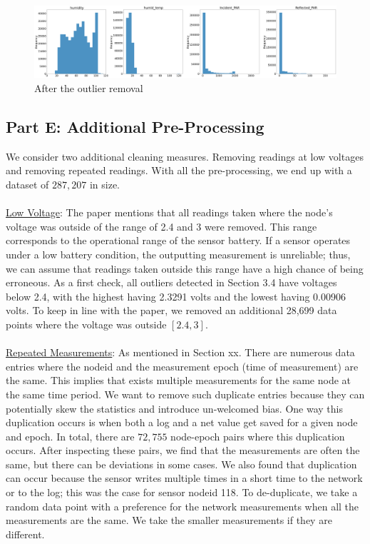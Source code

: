 \documentclass[11pt, letterpaper]{article}
\begin{document}
\begin{figure}[h!]
\centering
\includegraphics[width=1.0\textwidth]{Fig4_combined_hist_after.png}
\caption{After the outlier removal}
\label{fig3:combined_hist_after_clean}
\end{figure}


\subsection{Part E: Additional Pre-Processing}
We consider two additional cleaning measures. Removing readings at low voltages and removing repeated readings. With all the pre-processing, we end up with a dataset of $287,207$ in size.
\\ \\
\underline{Low Voltage}: The paper mentions that all readings taken where the node's voltage was outside of the range of 2.4 and 3 were removed. This range corresponds to the operational range of the sensor battery. If a sensor operates under a low battery condition, the outputting measurement is unreliable; thus, we can assume that readings taken outside this range have a high chance of being erroneous. As a first check, all outliers detected in Section 3.4 have voltages below 2.4, with the highest having 2.3291 volts and the lowest having 0.00906 volts. To keep in line with the paper, we removed an additional 28,699 data points where the voltage was outside $[2.4, 3]$.
\\ \\
\underline{Repeated Measurements}: As mentioned in Section xx. There are numerous data entries where the nodeid and the measurement epoch (time of measurement) are the same. This implies that exists multiple measurements for the same node at the same time period. We want to remove such duplicate entries because they can potentially skew the statistics and introduce un-welcomed bias. One way this duplication occurs is when both a log and a net value get saved for a given node and epoch. In total, there are $72,755$ node-epoch pairs where this duplication occurs. After inspecting these pairs, we find that the measurements are often the same, but there can be deviations in some cases. We also found that duplication can occur because the sensor writes multiple times in a short time to the network or to the log; this was the case for sensor nodeid 118. To de-duplicate, we take a random data point with a preference for the network measurements when all the measurements are the same. We take the smaller measurements if they are different. 
\end{document}
